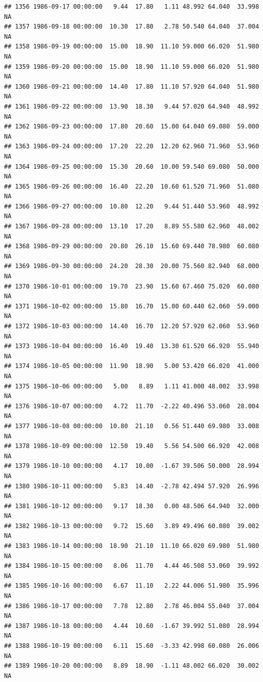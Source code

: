 \documentclass{article}\usepackage{graphicx, color}
\makeatletter
\newenvironment{kframe}{%
 \def\at@end@of@kframe{}%
 \ifinner\ifhmode%
  \def\at@end@of@kframe{\end{minipage}}%
  \begin{minipage}{\columnwidth}%
 \fi\fi%
 \def\FrameCommand##1{\hskip\@totalleftmargin \hskip-\fboxsep
 \colorbox{shadecolor}{##1}\hskip-\fboxsep
     \hskip-\linewidth \hskip-\@totalleftmargin \hskip\columnwidth}%
 \MakeFramed {\advance\hsize-\width
   \@totalleftmargin\z@ \linewidth\hsize
   \@setminipage}}%
 {\par\unskip\endMakeFramed%
 \at@end@of@kframe}
\newenvironment{knitrout}{}{} %
\makeatother
\begin{document}
\begin{knitrout}
\begin{kframe}
\begin{verbatim}
## 1356 1986-09-17 00:00:00   9.44  17.80   1.11 48.992 64.040  33.998     NA
## 1357 1986-09-18 00:00:00  10.30  17.80   2.78 50.540 64.040  37.004     NA
## 1358 1986-09-19 00:00:00  15.00  18.90  11.10 59.000 66.020  51.980     NA
## 1359 1986-09-20 00:00:00  15.00  18.90  11.10 59.000 66.020  51.980     NA
## 1360 1986-09-21 00:00:00  14.40  17.80  11.10 57.920 64.040  51.980     NA
## 1361 1986-09-22 00:00:00  13.90  18.30   9.44 57.020 64.940  48.992     NA
## 1362 1986-09-23 00:00:00  17.80  20.60  15.00 64.040 69.080  59.000     NA
## 1363 1986-09-24 00:00:00  17.20  22.20  12.20 62.960 71.960  53.960     NA
## 1364 1986-09-25 00:00:00  15.30  20.60  10.00 59.540 69.080  50.000     NA
## 1365 1986-09-26 00:00:00  16.40  22.20  10.60 61.520 71.960  51.080     NA
## 1366 1986-09-27 00:00:00  10.80  12.20   9.44 51.440 53.960  48.992     NA
## 1367 1986-09-28 00:00:00  13.10  17.20   8.89 55.580 62.960  48.002     NA
## 1368 1986-09-29 00:00:00  20.80  26.10  15.60 69.440 78.980  60.080     NA
## 1369 1986-09-30 00:00:00  24.20  28.30  20.00 75.560 82.940  68.000     NA
## 1370 1986-10-01 00:00:00  19.70  23.90  15.60 67.460 75.020  60.080     NA
## 1371 1986-10-02 00:00:00  15.80  16.70  15.00 60.440 62.060  59.000     NA
## 1372 1986-10-03 00:00:00  14.40  16.70  12.20 57.920 62.060  53.960     NA
## 1373 1986-10-04 00:00:00  16.40  19.40  13.30 61.520 66.920  55.940     NA
## 1374 1986-10-05 00:00:00  11.90  18.90   5.00 53.420 66.020  41.000     NA
## 1375 1986-10-06 00:00:00   5.00   8.89   1.11 41.000 48.002  33.998     NA
## 1376 1986-10-07 00:00:00   4.72  11.70  -2.22 40.496 53.060  28.004     NA
## 1377 1986-10-08 00:00:00  10.80  21.10   0.56 51.440 69.980  33.008     NA
## 1378 1986-10-09 00:00:00  12.50  19.40   5.56 54.500 66.920  42.008     NA
## 1379 1986-10-10 00:00:00   4.17  10.00  -1.67 39.506 50.000  28.994     NA
## 1380 1986-10-11 00:00:00   5.83  14.40  -2.78 42.494 57.920  26.996     NA
## 1381 1986-10-12 00:00:00   9.17  18.30   0.00 48.506 64.940  32.000     NA
## 1382 1986-10-13 00:00:00   9.72  15.60   3.89 49.496 60.080  39.002     NA
## 1383 1986-10-14 00:00:00  18.90  21.10  11.10 66.020 69.980  51.980     NA
## 1384 1986-10-15 00:00:00   8.06  11.70   4.44 46.508 53.060  39.992     NA
## 1385 1986-10-16 00:00:00   6.67  11.10   2.22 44.006 51.980  35.996     NA
## 1386 1986-10-17 00:00:00   7.78  12.80   2.78 46.004 55.040  37.004     NA
## 1387 1986-10-18 00:00:00   4.44  10.60  -1.67 39.992 51.080  28.994     NA
## 1388 1986-10-19 00:00:00   6.11  15.60  -3.33 42.998 60.080  26.006     NA
## 1389 1986-10-20 00:00:00   8.89  18.90  -1.11 48.002 66.020  30.002     NA

\end{verbatim}
\end{kframe}
\end{knitrout}
\end{document}
